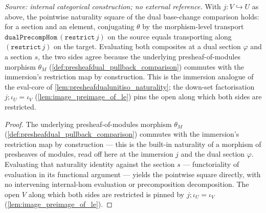 \begin{lemma}\leanok
  \label{lem:presheafdual_pullback_restrict_natural_apply}
  \textit{Source: internal categorical construction; no external reference.}
  With \(j : V \hookrightarrow U\) as above, the pointwise naturality square of the dual base-change
  comparison holds: for a section and an element, conjugating \(\theta\) by the morphism-level
  transport \(\mathtt{dualPrecompHom}\,(\mathtt{restrict}\,j)\) on the source equals transporting along
  \((\mathtt{restrict}\,j)\) on the target. Evaluating both composites at a dual section \(\varphi\)
  and a section \(s\), the two sides agree because the underlying presheaf-of-modules morphism
  \(\theta_M\) (\cref{def:presheafdual_pullback_comparison}) commutes with the immersion's restriction
  map by construction. This is the immersion analogue of the eval-core of
  \cref{lem:presheafdualunitiso_naturality}; the down-set factorisation
  \(j \mathbin{;} \iota_U = \iota_V\) (\cref{lem:image_preimage_of_le}) pins the open along which both
  sides are restricted.
\end{lemma}
\begin{proof}
  \leanok
  The underlying presheaf-of-modules morphism \(\theta_M\)
  (\cref{def:presheafdual_pullback_comparison}) commutes with the immersion's restriction map by
  construction --- this is the built-in naturality of a morphism of presheaves of modules, read off
  here at the immersion \(j\) and the dual section \(\varphi\). Evaluating that naturality identity
  against the section \(s\) --- functoriality of evaluation in its functional argument --- yields the
  pointwise square directly, with no intervening internal-hom evaluation or precomposition
  decomposition. The open \(V\) along which both sides are restricted is pinned by
  \(j \mathbin{;} \iota_U = \iota_V\) (\cref{lem:image_preimage_of_le}).
\end{proof}

